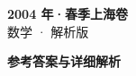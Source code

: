 \documentclass[zihao=-4, a4paper]{ctexart}
\begin{document}
\begin{center}
  {\Large\bfseries 2004 年·春季上海卷}\\[4pt]
  {\large 数学 · 解析版}
\end{center}
\medskip
{}

\clearpage
{}
\begin{center}{\Large\bfseries 参考答案与详细解析}\end{center}
\medskip

\end{document}
